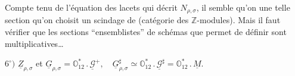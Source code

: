 Compte tenu de l'équation des lacets qui décrit $N_{\rho,\sigma}$, il semble qu'on  une telle section  qu'on choisit un scindage de
(catégorie des $\mathbb Z$-modules). Mais il faut vérifier que les sections \textquotedblleft ensemblistes\textquotedblright{} de schémas que  permet de définir sont multiplicatives\dots
{}

\(6^\circ)\) \(\underline Z_{\rho,\sigma}\) et
\(\underline G_{\rho,\sigma}=\mathbb O_{12}^{*}\mathbin{.}\underline{\mathcal G}^{+},\quad
\underline G_{\rho,\sigma}^{\sharp}\simeq\mathbb O_{12}^{*}\mathbin{.}\underline{\mathcal G}^{\sharp}
=\mathbb O_{12}^{*}\mathbin{.}\underline M\).

